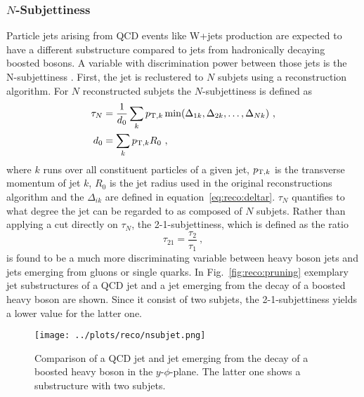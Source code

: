 \subsubsection*{$N$-Subjettiness}
Particle jets arising from QCD events like W+jets production are expected to have a different substructure compared to jets from hadronically decaying boosted bosons. A variable with discrimination power between those jets is the N-subjettiness \cite{nsubjettiness}. First, the jet is reclustered to $N$ subjets using a reconstruction algorithm. For $N$ reconstructed subjets the $N$-subjettiness is defined as
\begin{align}
\tau_N &= \frac{1}{d_0} \sum_k p_{{\rm T},k} \min(\Delta_{1k},\Delta_{2k},\dots,\Delta_{Nk}) ~, \\
d_0 &= \sum_k p_{{\rm T},k} R_0 ~,
\end{align}
where $k$ runs over all constituent particles of a given jet, $p_{{\rm T},k}$ is the transverse momentum of jet $k$, $R_0$ is the jet radius used in the original reconstructions algorithm and the $\Delta_{ik}$ are defined in equation~\ref{eq:reco:deltar}. $\tau_N$ quantifies to what degree the jet can be regarded to as composed of $N$ subjets. Rather than applying a cut directly on $\tau_N$, the 2-1-subjettiness, which is defined as the ratio
\begin{equation}
\tau_{21}=\frac{\tau_2}{\tau_1} ~,
\end{equation}
is found to be a much more discriminating variable between heavy boson jets and jets emerging from gluons or single quarks. In Fig.~\ref{fig:reco:pruning} exemplary jet substructures of a QCD jet and a jet emerging from the decay of a boosted heavy boson are shown. Since it consist of two subjets, the 2-1-subjettiness yields a lower value for the latter one.
\begin{figure}
    \centering
    \texttt{[image: ../plots/reco/nsubjet.png]}
    \caption[Comparison of a QCD jet and jet emergin from the decay of a boosted heavy boson in the $y$-$\phi$-plane]{Comparison of a QCD jet and jet emerging from the decay of a boosted heavy boson in the $y$-$\phi$-plane. The latter one shows a substructure with two subjets.}
    \label{fig:reco:nsubjet}
\end{figure}
